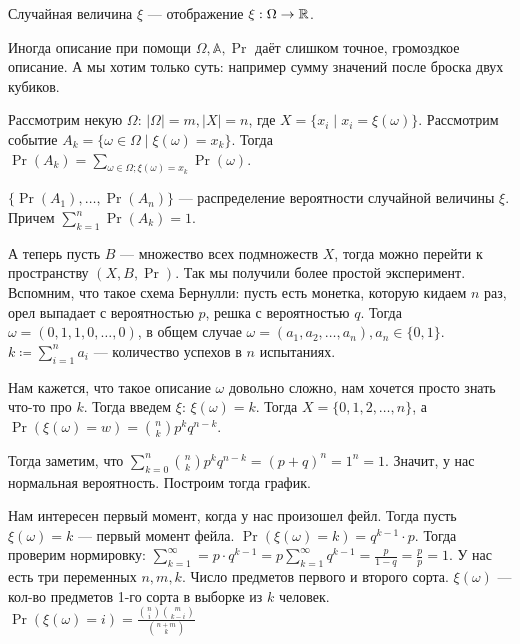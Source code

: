 
\begin{definition}
    Случайная величина $\xi$ --- отображение  $\xi: \Omega \to \mathbb{R}$.
\end{definition}
\slashn
Иногда описание при помощи $\Omega, \mathbb{A}, \Pr$ даёт слишком точное, громоздкое описание. А мы хотим только суть: например сумму значений после броска двух кубиков.

Рассмотрим некую $\Omega$: $|\Omega| = m, |X| = n$, где  $X = \{x_i \mid x_i = \xi(\omega)\}$. Рассмотрим событие $A_k = \{ \omega \in \Omega \mid \xi (\omega) = x_k \}$. Тогда  $\Pr(A_k) = \sum_{\omega \in \Omega; \xi(\omega) = x_k} \Pr(\omega)$.

\begin{definition}
    $\{\Pr(A_1), \ldots, \Pr(A_n)\}$ --- распределение вероятности случайной величины $\xi$. Причем $\sum_{k=1}^n \Pr(A_k) = 1$.
\end{definition}
\slashn
А теперь пусть $B$ --- множество всех подмножеств  $X$, тогда можно перейти к пространству  $(X, B, \Pr)$. Так мы получили более простой эксперимент.
Вспомним, что такое схема Бернулли: пусть есть монетка, которую кидаем  $n$ раз, орел выпадает с вероятностью  $p$, решка с вероятностью  $q$. Тогда $\omega = (0,1,1,0,\ldots,0)$, в общем случае $\omega = (a_1, a_2,\ldots,a_n), a_n \in \{0,1\}$. $k \coloneqq \sum_{i=1}^n a_i$  --- количество успехов в $n$ испытаниях.

Нам кажется, что такое описание $\omega$ довольно сложно, нам хочется просто знать что-то про $k$. Тогда введем  $\xi$:  $\xi(\omega) = k$. Тогда  $X = \{0,1,2,\ldots,n\}$, а $\Pr(\xi(\omega)=w) = \binom{n}{k} p^k q^{n-k}$. 

Тогда заметим, что  $\sum_{k=0}^n \binom{n}{k} p^k q^{n-k} = (p+q)^n = 1^n = 1$. Значит, у нас нормальная вероятность. Построим тогда график.
\begin{center}
\end{center}
Нам интересен первый момент, когда у нас произошел фейл. Тогда пусть $\xi(\omega) = k$ --- первый момент фейла.  $\Pr(\xi(\omega)=k) = q^{k-1}\cdot p$. Тогда проверим нормировку:  $\sum_{k=1}^\infty = p\cdot q^{k-1} = p \sum_{k=1}^\infty q^{k-1} = \frac{p}{1-q} = \frac{p}{p} = 1$.
У нас есть три переменных $n, m, k$. Число предметов первого и второго сорта. $\xi(\omega)$ --- кол-во предметов 1-го сорта в выборке из  $k$ человек. $\Pr(\xi(\omega) = i) = \frac{\binom{n}{i} \binom{m}{k-i}}{\binom{n+m}{k}}$ 

